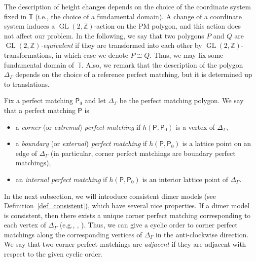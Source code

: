 \documentclass[pdftex]{sigma}%
\numberwithin{equation}{section}
\numberwithin{figure}{section}
\numberwithin{table}{section}
\newcommand{\ZZ}{\mathbb{Z}}
\newcommand{\TT}{\mathbb{T}}
\newcommand{\sfP}{\mathsf{P}}
\newcommand{\GL}{\operatorname{GL}}
\begin{document}
\begin{Remark}\label{rem_polygon}
The description of height changes depends on the choice of the coordinate system fixed in $\TT$
(i.e., the choice of a fundamental domain).
A change of a coordinate system induces a $\GL(2,\ZZ)$-action on the PM polygon, and this action does not affect our problem.
In the following, we say that two polygons $P$ and $Q$ are \emph{$\GL(2,\ZZ)$-equivalent} if they are transformed into each other by $\GL(2,\ZZ)$-transformations, in which case we denote $P\cong Q$.
Thus, we may fix some fundamental domain of~$\TT$.
Also, we remark that the description of the polygon $\Delta_\Gamma$ depends on the choice of a reference perfect matching, but it is determined up to translations.
\end{Remark}

\begin{Definition}\label{def_corner}
Fix a perfect matching $\sfP_0$ and let $\Delta_\Gamma$ be the perfect matching polygon.
We say that a perfect matching $\sfP$ is
\begin{itemize}\itemsep=0pt
\item a \emph{corner} (or \emph{extremal}) \emph{perfect matching} if $h(\sfP,\sfP_0)$ is a vertex of $\Delta_\Gamma$,
\item a \emph{boundary} (or \emph{external}) \emph{perfect matching} if $h(\sfP,\sfP_0)$ is a lattice point on an edge of $\Delta_\Gamma$
(in particular, corner perfect matchings are boundary perfect matchings),
\item an \emph{internal} \emph{perfect matching} if $h(\sfP,\sfP_0)$ is an interior lattice point of $\Delta_\Gamma$.
\end{itemize}
\end{Definition}

In the next subsection, we will introduce consistent dimer models (see Definition~\ref{def_consistent}), which have several nice properties.
If a dimer model is consistent, then there exists a unique corner perfect matching corresponding to each vertex of $\Delta_\Gamma$
(e.g., \cite[Corollary~4.27]{Bro}, \cite[Proposition~9.2]{IU2}).
Thus, we can give a cyclic order to corner perfect matchings along the corresponding vertices of $\Delta_\Gamma$ in the anti-clockwise direction.
We say that two corner perfect matchings are \emph{adjacent} if they are adjacent with respect to the given cyclic order.
\end{document}
